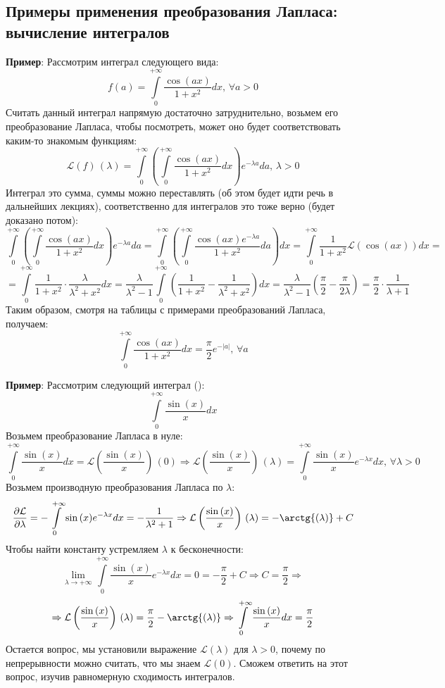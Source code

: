 \documentclass[12pt]{article}
\newcommand{\ML}{\mathcal{L}}
\theoremstyle{definition}
\newcommand{\ddint}[2]{\displaystyle\int\limits_{#1}^{#2}}
\begin{document}
\newpage
\subsection*{Примеры применения преобразования Лапласа: вычисление интегралов}
\textbf{Пример}: Рассмотрим интеграл следующего вида:
$$
	f(a) = \ddint{0}{+\infty}\dfrac{\cos{(ax)}}{1+ x^2}dx, \, \forall a > 0
$$
Считать данный интеграл напрямую достаточно затруднительно, возьмем его преобразование Лапласа, чтобы посмотреть, может оно будет соответствовать каким-то знакомым функциям:
$$
	\ML(f)\, (\lambda) = \ddint{0}{+\infty}\left(\ddint{0}{+\infty}\dfrac{\cos{(ax)}}{1 + x^2}dx\right)e^{-\lambda a}da, \, \lambda > 0
$$
Интеграл это сумма, суммы можно переставлять (об этом будет идти речь в дальнейших лекциях), соответственно для интегралов это тоже верно (будет доказано потом):
$$
	\ddint{0}{+\infty}\left(\ddint{0}{+\infty}\dfrac{\cos{(ax)}}{1 + x^2}dx\right)e^{-\lambda a}da = \ddint{0}{+\infty}\left(\ddint{0}{+\infty}\dfrac{\cos{(ax)}e^{-\lambda a}}{1 + x^2}da\right)dx = \ddint{0}{+\infty}\dfrac{1}{1 + x^2}\ML(\cos{(ax)})dx = 
$$
$$	
	= \ddint{0}{+\infty}\dfrac{1}{1+x^2}{\cdot}\dfrac{\lambda}{\lambda^2 + x^2}dx = \dfrac{\lambda}{\lambda^2 - 1} \ddint{0}{+\infty}\left(\dfrac{1}{1+ x^2} - \dfrac{1}{\lambda^2 + x^2}\right)dx = \dfrac{\lambda}{\lambda^2 - 1}\left(\dfrac{\pi}{2} - \dfrac{\pi}{2\lambda}\right) = \dfrac{\pi}{2}{\cdot}\dfrac{1}{\lambda + 1}
$$
Таким образом, смотря на таблицы с примерами преобразований Лапласа, получаем:
$$
	\ddint{0}{+\infty}\dfrac{\cos{(ax)}}{1+ x^2}dx = \dfrac{\pi}{2}e^{-|a|}, \, \forall a 
$$

\textbf{Пример}: Рассмотрим следующий интеграл ():
$$
	\ddint{0}{+\infty}\dfrac{\sin{(x)}}{x}dx
$$
Возьмем преобразование Лапласа в нуле:
$$
	\ddint{0}{+\infty}\dfrac{\sin{(x)}}{x}dx = \ML\left(\dfrac{\sin{(x)}}{x}\right)\, (0) \Rightarrow \ML\left(\dfrac{\sin{(x)}}{x}\right)\, (\lambda) = \ddint{0}{+\infty}\dfrac{\sin{(x)}}{x}e^{-\lambda x}dx, \, \forall \lambda >0
$$
Возьмем производную преобразования Лапласа по $\lambda$:
$$
	\dfrac{\partial \ML}{\partial \lambda} = -\ddint{0}{+\infty}\sin{(x)}e^{-\lambda x}dx = - \dfrac{1}{\lambda^2 + 1} \Rightarrow \ML\left(\dfrac{\sin{(x)}}{x}\right)\, (\lambda) = - \arctg{(\lambda)} + C
$$
Чтобы найти константу устремляем $\lambda$ к бесконечности:
$$
	\lim\limits_{\lambda \to +\infty}\ddint{0}{+\infty}\dfrac{\sin{(x)}}{x}e^{-\lambda x}dx = 0 = -\dfrac{\pi}{2} + C \Rightarrow C = \dfrac{\pi}{2} \Rightarrow
$$
$$
	\Rightarrow \ML\left(\dfrac{\sin{(x)}}{x}\right)\, (\lambda) = \dfrac{\pi}{2} - \arctg{(\lambda)} \Rightarrow  \ddint{0}{+\infty}\dfrac{\sin{(x)}}{x}dx = \dfrac{\pi}{2}
$$
Остается вопрос, мы установили выражение $\ML(\lambda)$ для $\lambda > 0$, почему по непрерывности можно считать, что мы знаем $\ML(0)$. Сможем ответить на этот вопрос, изучив равномерную сходимость интегралов.
\end{document}
